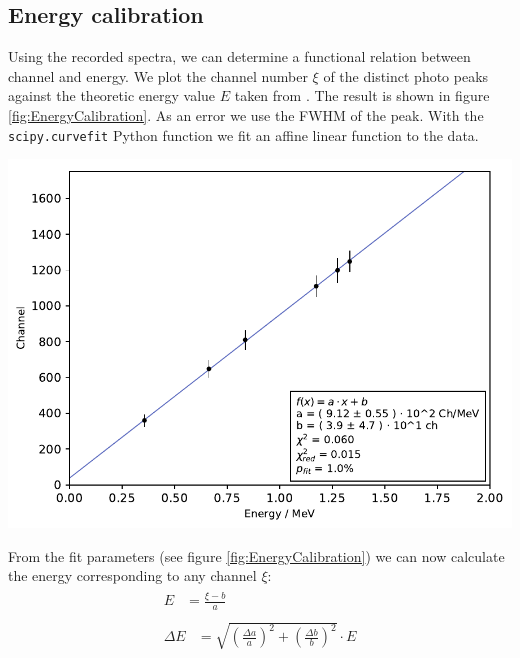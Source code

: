 \subsection{Energy calibration}
%
Using the recorded spectra, we can determine a functional relation between channel and energy.
We plot the channel number $\xi$ of the distinct photo peaks against the theoretic energy value $E$ taken from \cite{Anleitung}.
The result is shown in figure \ref{fig:EnergyCalibration}.
As an error we use the FWHM of the peak.
With the \texttt{scipy.curvefit} Python function we fit an affine linear function to the data.
%
\par
%
\minipage{\linewidth}
    \begin{center}
        \captionsetup{type=figure}
        \begin{adjustbox}{max width=\linewidth, keepaspectratio}
            \includegraphics[]{pdf/energy_calibration}
        \end{adjustbox}
        \label{fig:EnergyCalibration}
    \end{center}
\endminipage
%
\par
%
From the fit parameters (see figure \ref{fig:EnergyCalibration}) we can now calculate the energy corresponding to any channel $\xi$:
\begin{align}
    \label{eq:}
    \begin{split}
        E &= \frac{\xi - b}{a}
    \end{split}
    \\
    \label{eq:}
    \begin{split}
        \Delta E &= \sqrt{ \left ( \frac{ \Delta a}{ a } \right ) ^2 + \left ( \frac{\Delta b}{b} \right ) ^2 } \cdot E
    \end{split}
\end{align}
%
